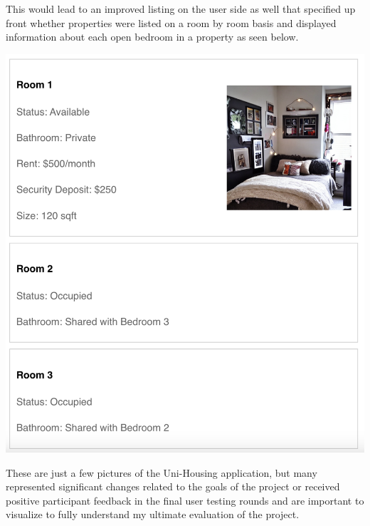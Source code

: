 \documentclass[10pt,twocolumn]{article}
\begin{document}
This would lead to an improved listing on the user side as well that specified up front whether properties were listed on a room by room basis and displayed information about each open bedroom in a property as seen below. \\

\centerline{\includegraphics[scale=.15]{Room by Room Listing.png}} 

These are just a few pictures of the Uni-Housing application, but many represented significant changes related to the goals of the project or received positive participant feedback in the final user testing rounds and are important to visualize to fully understand my ultimate evaluation of the project.
\end{document}
